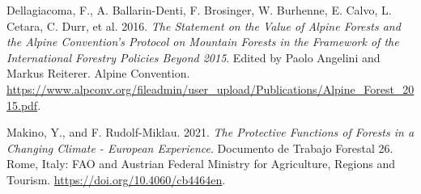 \documentclass[
]{book}
\newlength{\cslhangindent}
\newlength{\cslentryspacingunit} %
\newenvironment{CSLReferences}[2] %
 {%
  \setlength{\parindent}{0pt}
  \ifodd #1
  \let\oldpar\par
  \def\par{\hangindent=\cslhangindent\oldpar}
  \fi
  \setlength{\parskip}{#2\cslentryspacingunit}
 }%
 {}
\begin{document}
\hypertarget{refs}{}
\begin{CSLReferences}{1}{0}
\leavevmode{}%
Dellagiacoma, F., A. Ballarin-Denti, F. Brosinger, W. Burhenne, E. Calvo, L. Cetara, C. Durr, et al. 2016. \emph{The {Statement} on the {Value} of {Alpine Forests} and the {Alpine Convention}'s {Protocol} on {Mountain Forests} in the Framework of the International Forestry Policies Beyond 2015}. Edited by Paolo Angelini and Markus Reiterer. {Alpine Convention}. \url{https://www.alpconv.org/fileadmin/user_upload/Publications/Alpine_Forest_2015.pdf}.

\leavevmode{}%
Makino, Y., and F. Rudolf-Miklau. 2021. \emph{The Protective Functions of Forests in a Changing Climate - {European} Experience}. Documento de Trabajo Forestal 26. {Rome, Italy}: {FAO and Austrian Federal Ministry for Agriculture, Regions and Tourism}. \url{https://doi.org/10.4060/cb4464en}.

\end{CSLReferences}
\end{document}

